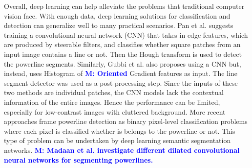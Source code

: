 \documentclass[journal]{IEEEtran}
\newcommand{\commentM}[1]{\textbf{\textcolor{blue}{M: #1}}}
\begin{document}
Overall, deep learning can help alleviate the problems that traditional computer vision face. With enough data, deep learning solutions for classification and detection can generalize well to many practical scenarios. Pan et al. \cite{related_work_chaofeng_pan_2016} suggests training a convolutional neural network (CNN) that takes in edge features, which are produced by steerable filters, and classifies whether square patches from an input image contains a line or not. Then the Hough transform is used to detect the powerline segments. Similarly, Gubbi et al. \cite{related_work_jayavardhana_gubbi} also proposes using a CNN but, instead, uses Histogram of \commentM{Oriented} Gradient features as input. The line segment detector \cite{lsd} was used as a post processing step. Since the inputs of these two methods are individual patches, the CNN models lack the contextual information of the entire images. Hence the performance can be limited, especially for low-contrast images with cluttered background. More recent approaches \cite{related_work_rainesh_mandaan_2017,related_work_heng_zhang_2019,related_work_yan_li_2019,related_work_omer_emre_yetgin_2018,related_work_rabab_abdelfattah_2022,related_work_rabeea_haffari_2021} frame powerline detection as binary pixel-level classification problems where each pixel is classified whether is belongs to the powerline or not. This type of problem can be undertaken by deep learning semantic segmentation networks. 
\commentM{Madaan et al. \cite{related_work_rainesh_mandaan_2017} investigate different dilated convolutional neural networks for segmenting powerlines. }
\end{document}

